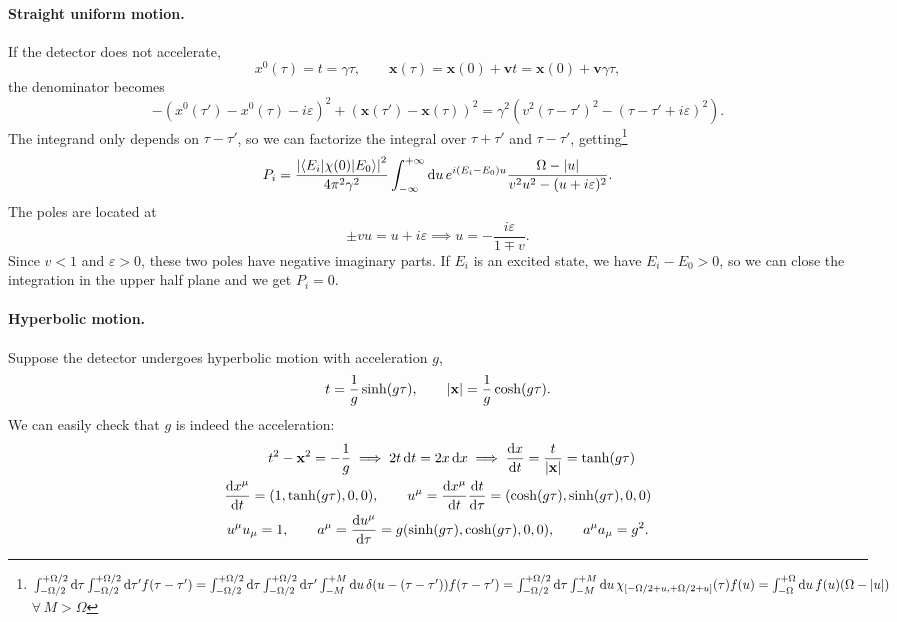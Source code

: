 \documentclass[a4paper,12pt]{book}
\DeclarePairedDelimiter{\abs}{\lvert}{\rvert}
\renewcommand{\vec}{\mathbf}
\newcommand{\dd}{\mathop{\mathrm{d}\!}{}}
\renewcommand{\epsilon}{\varepsilon}
\theoremstyle{definition}
\theoremstyle{remark}
\begin{document}
\paragraph{Straight uniform motion.} If the detector does not accelerate,
\[x^0(\tau)=t=\gamma\tau,\qquad\vec x(\tau)=\vec x(0)+\vec vt=\vec x(0)+\vec v\gamma\tau,\]the denominator becomes
\[-(x^0(\tau')-x^0(\tau)-i\epsilon)^2+(\vec x(\tau')-\vec x(\tau))^2=\gamma^2(v^2(\tau-\tau')^2-(\tau-\tau'+i\epsilon)^2).\]
The integrand only depends on $\tau-\tau'$, so we can factorize the integral over $\tau+\tau'$ and $\tau-\tau'$, getting\footnote{$\int_{-\Omega/2}^{+\Omega/2}\dd\tau\int_{-\Omega/2}^{+\Omega/2}\dd\tau' f(\tau-\tau')=\int_{-\Omega/2}^{+\Omega/2}\dd\tau\int_{-\Omega/2}^{+\Omega/2}\dd\tau'\int_{-M}^{+M}\dd u\,\delta(u-(\tau-\tau')) f(\tau-\tau')=\int_{-\Omega/2}^{+\Omega/2}\dd\tau\int_{-M}^{+M}\dd u\, \chi_{[-\Omega/2+u,+\Omega/2+u]}(\tau)f(u)=\int_{-\Omega}^{+\Omega}\dd u\,f(u)(\Omega-\abs{u})$ $\forall\,M>\Omega$}
\[P_i=\frac{\abs*{\braket{E_i|\chi(0)|E_0}}^2}{4\pi^2\gamma^2}\int_{-\infty}^{+\infty}\dd u\,e^{i(E_i-E_0)u}\frac{\Omega-\abs{u}}{v^2u^2-(u+i\epsilon)^2}.\]
The poles are located at
\[\pm vu=u+i\epsilon\implies u=-\frac{i\epsilon}{1\mp v}.\]
Since $v<1$ and $\epsilon>0$, these two poles have negative imaginary parts. If $E_i$ is an excited state, we have $E_i-E_0>0$, so we can close the integration in the upper half plane and we get $P_i=0$.

\paragraph{Hyperbolic motion.} Suppose the detector undergoes hyperbolic motion with acceleration $g$,
\[t=\frac1g\sinh(g\tau),\qquad \abs{\vec x}=\frac1g\cosh(g\tau).\]
We can easily check that $g$ is indeed the acceleration:
\begin{gather*}
\qquad t^2-\vec x^2=-\frac1g\implies 2t\dd t=2x\dd x\implies\frac{\dd x}{\dd t}=\frac t{\abs{\vec x}}=\tanh(g\tau)\\
\frac{\dd x^\mu}{\dd t}=(1,\tanh(g\tau),0,0),\qquad u^\mu=\frac{\dd x^\mu}{\dd t}\frac{\dd t}{\dd \tau}=(\cosh(g\tau),\sinh(g\tau),0,0)\\
u^\mu u_\mu=1,\qquad a^\mu=\frac{\dd u^\mu}{\dd\tau}=g(\sinh(g\tau),\cosh(g\tau),0,0),\qquad a^\mu a_\mu=g^2.
\end{gather*}
\end{document}
